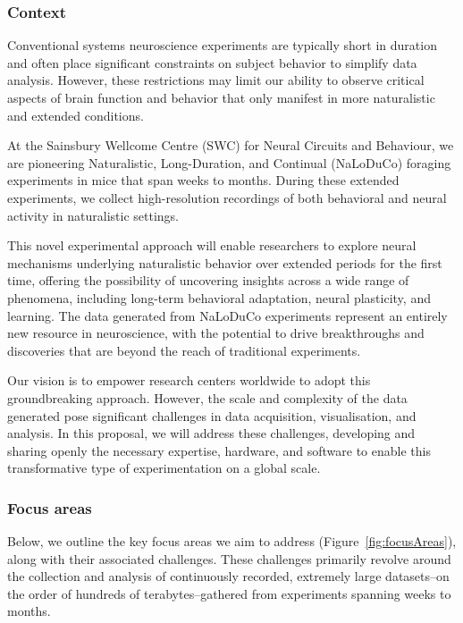 \subsubsection{Context}

Conventional systems neuroscience experiments are typically short in duration
and often place significant constraints on subject behavior to simplify data
analysis.
%
However, these restrictions may limit our ability to observe critical
aspects of brain function and behavior that only manifest in more naturalistic
and extended conditions.

At the Sainsbury Wellcome Centre (SWC) for Neural Circuits and Behaviour, we
are pioneering Naturalistic, Long-Duration, and Continual (NaLoDuCo) foraging
experiments in mice that span weeks to months. During these extended
experiments, we collect high-resolution recordings of both behavioral and
neural activity in naturalistic settings.
%

This novel experimental approach will enable researchers to explore neural
mechanisms underlying naturalistic behavior over extended periods for the first
time, offering the possibility of uncovering insights across a wide range of
phenomena, including long-term behavioral adaptation, neural plasticity, and
learning.
%
The data generated from NaLoDuCo experiments represent an entirely new resource
in neuroscience, with the potential to drive breakthroughs and discoveries that
are beyond the reach of traditional experiments.

Our vision is to empower research centers worldwide to adopt this
groundbreaking approach.
%
However, the scale and complexity of the data generated pose significant
challenges in data acquisition, visualisation, and analysis.
%
In this proposal, we will address these challenges, developing and sharing
openly the necessary expertise, hardware, and software to enable this
transformative type of experimentation on a global scale.

\subsubsection{Focus areas}

Below, we outline the key focus areas we aim to address
(Figure~\ref{fig:focusAreas}), along with their associated challenges.
%
These challenges primarily revolve around the collection and analysis of
continuously recorded, extremely large datasets--on the order of hundreds of
terabytes--gathered from experiments spanning weeks to months.

